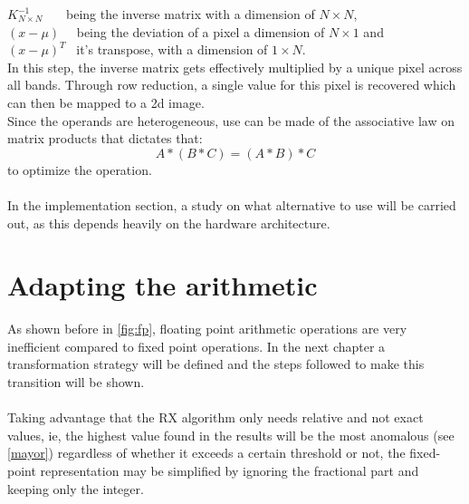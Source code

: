 \indent \(K^{-1}_{N \times N}\) \ \ \ being the inverse matrix with a dimension of \(N \times N\),\\
\indent \((x-\mu)\) \ \	being the deviation of a pixel a dimension of \(N \times 1\) and \\			
\indent \((x-\mu)^{T}\) \ it's transpose, with a dimension of \(1 \times N\).\\

\noindent In this step, the inverse matrix gets effectively multiplied by a unique pixel across all bands. Through row reduction, a single value for this pixel is recovered which can then be mapped to a 2d image.\\

Since the operands are heterogeneous, use can be made of the associative law on matrix products that dictates that:
	\[A * (B * C) = (A * B) * C\]
	to optimize the operation.\\


\paragraph{}
\label{alternativa}
In the implementation section, a study on what alternative to use will be carried out, as this depends heavily on the hardware architecture.

\section{Adapting the arithmetic}
As shown before in \autoref{fig:fp}, floating point arithmetic operations are very inefficient compared to fixed point operations. In the next chapter a transformation strategy will be defined and the steps followed to make this transition will be shown.
\\
\\
Taking advantage that the RX algorithm only needs relative and not exact values, ie, the highest value found in the results will be the most anomalous (see \ref{mayor}) regardless of whether it exceeds a certain threshold or not, the fixed-point representation may be simplified by ignoring the fractional part and keeping only the integer.

